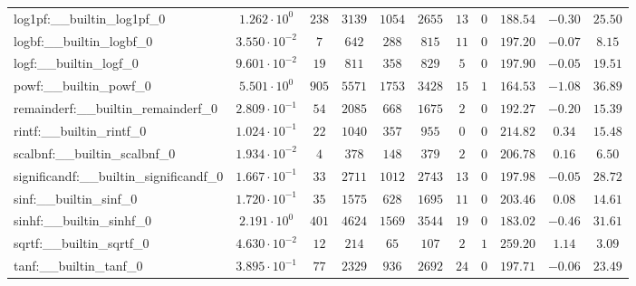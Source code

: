\begin{tabular}{|l|c|c|c|c|c|c|c|c|c|c|}
log1pf:\_\_builtin\_log1pf\_0             & $ 1.262 \cdot 10^{0}  $ & $ 238    $ & $ 3139  $ & $ 1054  $ & $ 2655  $ & $ 13  $ & $ 0 $ & $ 188.54      $ & $ -0.30   $ & $ 25.50   $ \\
logbf:\_\_builtin\_logbf\_0               & $ 3.550 \cdot 10^{-2} $ & $ 7      $ & $ 642   $ & $ 288   $ & $ 815   $ & $ 11  $ & $ 0 $ & $ 197.20      $ & $ -0.07   $ & $ 8.15    $ \\
logf:\_\_builtin\_logf\_0                 & $ 9.601 \cdot 10^{-2} $ & $ 19     $ & $ 811   $ & $ 358   $ & $ 829   $ & $ 5   $ & $ 0 $ & $ 197.90      $ & $ -0.05   $ & $ 19.51   $ \\
powf:\_\_builtin\_powf\_0                 & $ 5.501 \cdot 10^{0}  $ & $ 905    $ & $ 5571  $ & $ 1753  $ & $ 3428  $ & $ 15  $ & $ 1 $ & $ 164.53      $ & $ -1.08   $ & $ 36.89   $ \\
remainderf:\_\_builtin\_remainderf\_0     & $ 2.809 \cdot 10^{-1} $ & $ 54     $ & $ 2085  $ & $ 668   $ & $ 1675  $ & $ 2   $ & $ 0 $ & $ 192.27      $ & $ -0.20   $ & $ 15.39   $ \\
rintf:\_\_builtin\_rintf\_0               & $ 1.024 \cdot 10^{-1} $ & $ 22     $ & $ 1040  $ & $ 357   $ & $ 955   $ & $ 0   $ & $ 0 $ & $ 214.82      $ & $ 0.34    $ & $ 15.48   $ \\
scalbnf:\_\_builtin\_scalbnf\_0           & $ 1.934 \cdot 10^{-2} $ & $ 4      $ & $ 378   $ & $ 148   $ & $ 379   $ & $ 2   $ & $ 0 $ & $ 206.78      $ & $ 0.16    $ & $ 6.50    $ \\
significandf:\_\_builtin\_significandf\_0 & $ 1.667 \cdot 10^{-1} $ & $ 33     $ & $ 2711  $ & $ 1012  $ & $ 2743  $ & $ 13  $ & $ 0 $ & $ 197.98      $ & $ -0.05   $ & $ 28.72   $ \\
sinf:\_\_builtin\_sinf\_0                 & $ 1.720 \cdot 10^{-1} $ & $ 35     $ & $ 1575  $ & $ 628   $ & $ 1695  $ & $ 11  $ & $ 0 $ & $ 203.46      $ & $ 0.08    $ & $ 14.61   $ \\
sinhf:\_\_builtin\_sinhf\_0               & $ 2.191 \cdot 10^{0}  $ & $ 401    $ & $ 4624  $ & $ 1569  $ & $ 3544  $ & $ 19  $ & $ 0 $ & $ 183.02      $ & $ -0.46   $ & $ 31.61   $ \\
sqrtf:\_\_builtin\_sqrtf\_0               & $ 4.630 \cdot 10^{-2} $ & $ 12     $ & $ 214   $ & $ 65    $ & $ 107   $ & $ 2   $ & $ 1 $ & $ 259.20      $ & $ 1.14    $ & $ 3.09    $ \\
tanf:\_\_builtin\_tanf\_0                 & $ 3.895 \cdot 10^{-1} $ & $ 77     $ & $ 2329  $ & $ 936   $ & $ 2692  $ & $ 24  $ & $ 0 $ & $ 197.71      $ & $ -0.06   $ & $ 23.49   $ \\

\end{tabular}

